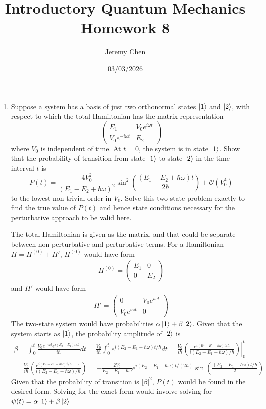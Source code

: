 \documentclass[10pt,letterpaper]{article}
\title{Introductory Quantum Mechanics Homework 8}
\author{Jeremy Chen}
\date{03/03/2026}
\begin{document}
	\maketitle

\begin{enumerate}

\item Suppose a system has a basis of just two orthonormal states $\ket{1}$ and $\ket{2}$, with respect to which the total Hamiltonian has the matrix representation
$$\begin{pmatrix}
E_{1} & V_{0}e^{i\omega t} \\
V_{0}e^{-i\omega t} & E_{2} 
\end{pmatrix}$$
where $V_{0}$ is independent of time. At $t = 0$, the system is in state $\ket{1}$. Show that the probability of transition from state $\ket{1}$ to state $\ket{2}$ in the time interval $t$ is
$$P(t) = \frac{4V_{0}^{2}}{(E_{1} - E_{2} + \hbar\omega)^{2}}\sin^{2}\left( \frac{(E_{1} - E_{2} + \hbar\omega)t}{2\hbar} \right) + \mathcal{O}(V_{0}^{4})$$
to the lowest non-trivial order in $V_{0}$. Solve this two-state problem exactly to find the true value of $P(t)$ and hence state conditions necessary for the perturbative approach to be valid here.

\color{violet}
The total Hamiltonian is given as the matrix, and that could be separate between non-perturbative and perturbative terms. For a Hamiltonian $H = H^{(0)} + H'$, $H^{(0)}$ would have form
\begin{gather*}
H^{(0)} = \begin{pmatrix}
E_{1} & 0 \\
0 & E_{2} 
\end{pmatrix}
\end{gather*}
and $H'$ would have form
\begin{gather*}
H' = \begin{pmatrix}
0 & V_{0}e^{i\omega t} \\
V_{0}e^{i\omega t} & 0 
\end{pmatrix}
\end{gather*}
The two-state system would have probabilities $\alpha\ket{1} + \beta\ket{2}$. Given that the system starts as $\ket{1}$, the probability amplitude of $\ket{2}$ is
\begin{gather*}
\beta = \int_{0}^{t} \frac{V_{0}e^{-i\omega t} e^{i(E_{2} - E_{1})t/\hbar}}{i\hbar} dt = \frac{V_{0}}{i\hbar} \int_{0}^{t} e^{i(E_{2} - E_{1} - \hbar\omega )t/\hbar} dt = \frac{V_{0}}{i\hbar} \left. \left( \frac{e^{i(E_{2} - E_{1} - \hbar\omega)t/\hbar}}{i(E_{2} - E_{1} - \hbar\omega)/\hbar} \right) \right\vert_{0}^{t} \\
= \frac{V_{0}}{i\hbar} \left( \frac{e^{i(E_{2} - E_{1} - \hbar\omega)t/\hbar} - 1}{i(E_{2} - E_{1} - \hbar\omega)/\hbar} \right) = -\frac{2V_{0}}{E_{2} - E_{1} - \hbar\omega} e^{i(E_{2} - E_{1} - \hbar\omega)t/(2\hbar)}\sin\left( \frac{(E_{2} - E_{1} - \hbar\omega)t/\hbar}{2} \right)
\end{gather*}
Given that the probability of transition is $|\beta|^{2}$, $P(t)$ would be found in the desired form. Solving for the exact form would involve solving for $\psi(t) = \alpha\ket{1} + \beta\ket{2}$
\color{black}


\end{enumerate}
\end{document}

